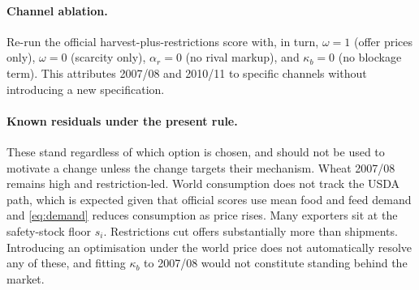 \paragraph{Channel ablation.}
Re-run the official harvest-plus-restrictions score with, in turn,
\(\omega=1\) (offer prices only), \(\omega=0\) (scarcity only),
\(\alpha_r=0\) (no rival markup), and \(\kappa_b=0\) (no blockage term).
This attributes 2007/08 and 2010/11 to specific channels without
introducing a new specification.

\paragraph{Known residuals under the present rule.}
These stand regardless of which option is chosen, and should not be used
to motivate a change unless the change targets their mechanism. Wheat
2007/08 remains high and restriction-led. World consumption does not track
the USDA path, which is expected given that official scores use mean food
and feed demand and \eqref{eq:demand} reduces consumption as price rises.
Many exporters sit at the safety-stock floor \(s_i\). Restrictions cut
offers substantially more than shipments. Introducing an optimisation
under the world price does not automatically resolve any of these, and
fitting \(\kappa_b\) to 2007/08 would not constitute standing behind the
market.
